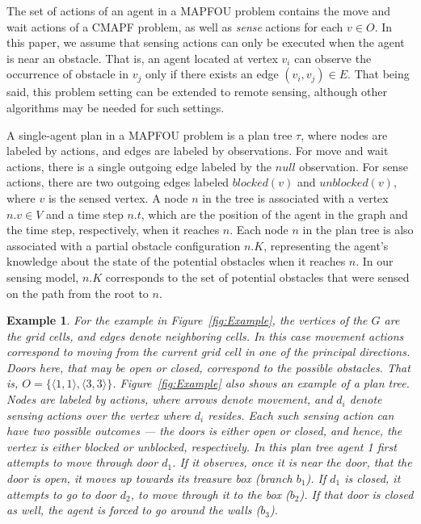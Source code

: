 \documentclass[letterpaper]{article} %
\newcommand{\blocked}{\textit{blocked}}
\newcommand{\unblocked}{\textit{unblocked}}
\newcommand{\roni}[1]{{\textcolor{green}{[Roni: #1]}}}
\newtheorem{exmp}{Example}
\begin{document}
The set of actions of an agent in a MAPFOU problem contains the move and wait actions of a CMAPF problem, as well as \emph{sense} actions for each $v \in O$.
In this paper, we assume that sensing actions can only be executed when the agent is near an obstacle. That is, an agent located at vertex $v_i$ can observe the occurrence of obstacle in $v_j$ only if there exists an edge $(v_i, v_j) \in E$. That being said, this problem setting can be extended to remote sensing, although other algorithms may be needed for such settings.

A single-agent plan in a MAPFOU problem is a plan tree $\tau$, where nodes are labeled by actions, and edges are labeled by observations. For move and wait actions, there is a single outgoing edge labeled by the $null$ observation. For sense actions, there are two outgoing edges labeled $\blocked(v)$ and $\unblocked(v)$, where $v$ is the sensed vertex.
A node $n$ in the tree is associated with a vertex $n.v \in V$ and a time step $n.t$, which are the position of the agent in the graph and the time step, respectively, when it reaches $n$.
Each node $n$ in the plan tree is also associated with a partial obstacle configuration $n.K$, representing the agent's knowledge about the state of the potential obstacles when it reaches $n$. In our sensing model, $n.K$ corresponds to the set of potential obstacles that were sensed on the path from the root to $n$.

\begin{exmp}
For the example in Figure~\ref{fig:Example}, the vertices of the $G$ are the grid cells, and edges denote neighboring cells. In this case movement actions correspond to moving from the current grid cell in one of the principal directions.
Doors here, that may be open or closed, correspond to the possible obstacles. That is, $O=\{ \langle 1,1 \rangle, \langle 3,3 \rangle \}$.
Figure~\ref{fig:Example} also shows an example of a plan tree. Nodes are labeled by actions, where arrows denote movement, and $d_i$ denote sensing actions over the vertex where $d_i$ resides. Each such sensing action can have two possible outcomes --- the doors is either open or closed, and hence, the vertex is either blocked or unblocked, respectively.
In this plan tree agent 1 first attempts to move through door $d_1$. If it observes, once it is near the door, that the door is open, it moves up towards its treasure box (branch $b_1$). If $d_1$ is closed, it attempts to go to door $d_2$, to move through it to the box ($b_2$). If that door is closed as well, the agent is forced to go around the walls ($b_3$).
\end{exmp}
\end{document}
